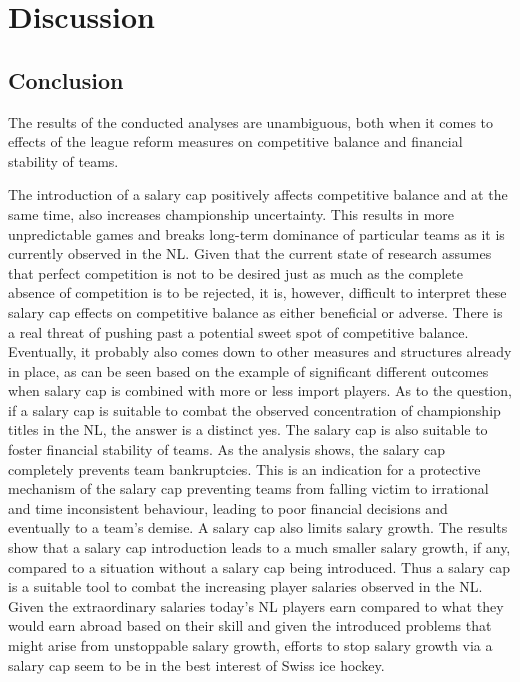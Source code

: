 \documentclass[12pt, a4paper]{article}
\begin{document}
\section{Discussion}

\subsection{Conclusion}

 The results of the conducted analyses are unambiguous, both when it comes to effects of the league reform measures on competitive balance and financial stability of teams.
 
 \noindent
 The introduction of a salary cap positively affects competitive balance and at the same time, also increases championship uncertainty. This results in more unpredictable games and breaks long-term dominance of particular teams as it is currently observed in the NL. Given that the current state of research assumes that perfect competition is not to be desired just as much as the complete absence of competition is to be rejected, it is, however, difficult to interpret these salary cap effects on competitive balance as either beneficial or adverse. There is a real threat of pushing past a potential sweet spot of competitive balance. Eventually, it probably also comes down to other measures and structures already in place, as can be seen based on the example of significant different outcomes when salary cap is combined with more or less import players. As to the question, if a salary cap is suitable to combat the observed concentration of championship titles in the NL, the answer is a distinct yes. The salary cap is also suitable to foster financial stability of teams. As the analysis shows, the salary cap completely prevents team bankruptcies. This is an indication for a protective mechanism of the salary cap preventing teams from falling victim to irrational and time inconsistent behaviour, leading to poor financial decisions and eventually to a team's demise. A salary cap also limits salary growth. The results show that a salary cap introduction leads to a much smaller salary growth, if any, compared to a situation without a salary cap being introduced. Thus a salary cap is a suitable tool to combat the increasing player salaries observed in the NL. Given the extraordinary salaries today's NL players earn compared to what they would earn abroad based on their skill and given the introduced problems that might arise from unstoppable salary growth, efforts to stop salary growth via a salary cap seem to be in the best interest of Swiss ice hockey. 
\end{document}
